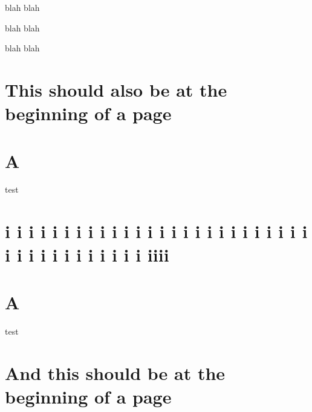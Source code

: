 \documentclass[baselinegrid,noprint,nocopyright]{uit-thesis}
\begin{document}
blah blah

blah blah

blah blah



\section{This should also be at the beginning of a page}
\section{A}
test

\section{i i i i i i i i i i i i i i i i i i i i i i i i i i i i i i i i i i i i i i iiii}
\section{A}
test

\newpage
\section{And this should be at the beginning of a page}
\end{document}
